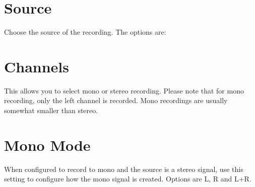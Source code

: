 \section{Source}
  Choose the source of the recording. The options are:

\section{Channels}
  This allows you to select mono or stereo recording. Please note that
  for mono recording, only the left channel is recorded. Mono recordings
  are usually somewhat smaller than stereo.

\section{Mono Mode}
  When configured to record to mono and the source is a stereo signal, use this
  setting to configure how the mono signal is created. Options are L, R and L+R.

